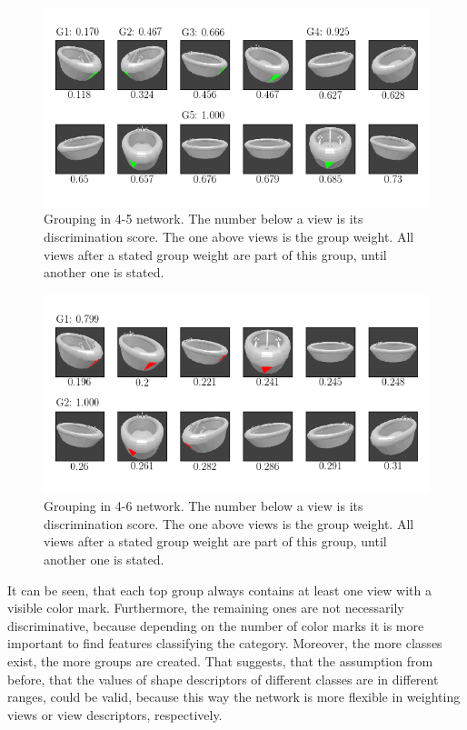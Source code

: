 \begin{figure}
	\centering
	\includegraphics[trim=10 20 10 20, clip]{images/mn-sl-4-5-20/bathtub_0107_4_grouping.png}
	\caption[Grouping in 4-5 network]{Grouping in 4-5 network. The number below a view is its discrimination score. The one above views is the group weight. All views after a stated group weight are part of this group, until another one is stated.}
	\label{fig:grouping-4-5}
\end{figure}
\begin{figure}
	\centering
	\includegraphics[trim=10 20 10 20, clip]{images/mn-sl-4-6-20/bathtub_0107_5_grouping.png}
	\caption[Grouping in 4-6 network]{Grouping in 4-6 network. The number below a view is its discrimination score. The one above views is the group weight. All views after a stated group weight are part of this group, until another one is stated.}
	\label{fig:grouping-4-6}
\end{figure}
It can be seen, that each top group always contains at least one view with a visible color mark.
Furthermore, the remaining ones are not necessarily discriminative, because depending on the number of color marks it is more important to find features classifying the category.
Moreover, the more classes exist, the more groups are created.
That suggests, that the assumption from before, that the values of shape descriptors of different classes are in different ranges, could be valid, because this way the network is more flexible in weighting views or view descriptors, respectively.